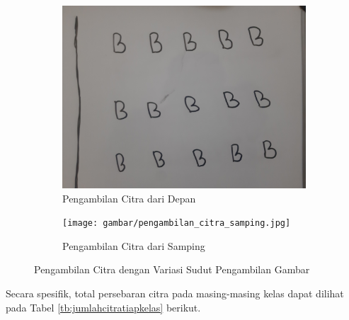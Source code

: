 \begin{figure}[H]
  \begin{subfigure}{.5\textwidth}
    \centering
    \captionsetup{width=.8\linewidth}
    \includegraphics[width=.85\linewidth]{gambar/pengambilan_citra_depan.jpg}
    \caption{Pengambilan Citra dari Depan}
    \label{fig:citradepan}
  \end{subfigure}%
  \begin{subfigure}{.5\textwidth}
    \centering
    \captionsetup{width=.8\linewidth}
    \texttt{[image: gambar/pengambilan\_citra\_samping.jpg]}
    \caption{Pengambilan Citra dari Samping}
    \label{fig:citrasamping}
  \end{subfigure}
  \caption{Pengambilan Citra dengan Variasi Sudut Pengambilan Gambar}
  \label{fig:pengambilancitrabervariasi}
\end{figure}

Secara spesifik, total persebaran citra pada masing-masing kelas dapat dilihat pada Tabel \ref{tb:jumlahcitratiapkelas} berikut. \par

